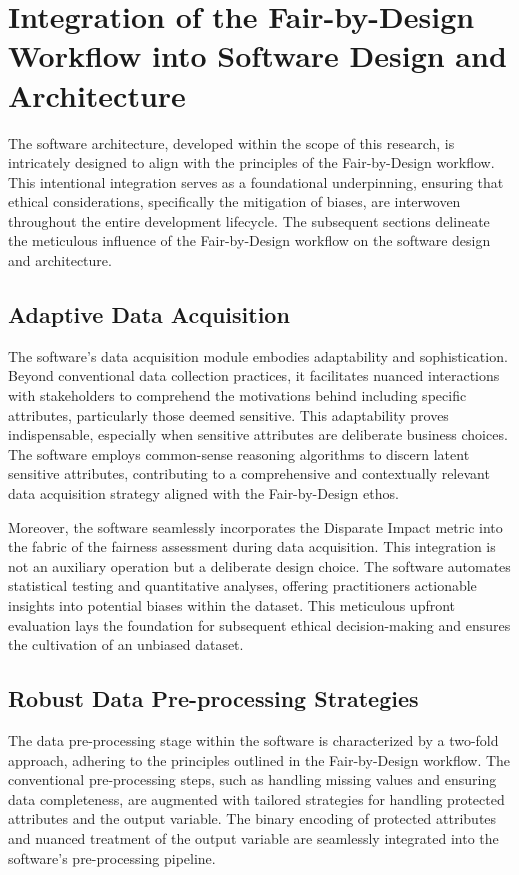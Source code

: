 \section{Integration of the Fair-by-Design Workflow into Software Design and Architecture}

The software architecture, developed within the scope of this research, is intricately designed to align with the principles of the Fair-by-Design workflow. This intentional integration serves as a foundational underpinning, ensuring that ethical considerations, specifically the mitigation of biases, are interwoven throughout the entire development lifecycle. The subsequent sections delineate the meticulous influence of the Fair-by-Design workflow on the software design and architecture.

\subsection{Adaptive Data Acquisition}

The software's data acquisition module embodies adaptability and sophistication. Beyond conventional data collection practices, it facilitates nuanced interactions with stakeholders to comprehend the motivations behind including specific attributes, particularly those deemed sensitive. This adaptability proves indispensable, especially when sensitive attributes are deliberate business choices. The software employs common-sense reasoning algorithms to discern latent sensitive attributes, contributing to a comprehensive and contextually relevant data acquisition strategy aligned with the Fair-by-Design ethos.

Moreover, the software seamlessly incorporates the Disparate Impact metric into the fabric of the fairness assessment during data acquisition. This integration is not an auxiliary operation but a deliberate design choice. The software automates statistical testing and quantitative analyses, offering practitioners actionable insights into potential biases within the dataset. This meticulous upfront evaluation lays the foundation for subsequent ethical decision-making and ensures the cultivation of an unbiased dataset.

\subsection{Robust Data Pre-processing Strategies}

The data pre-processing stage within the software is characterized by a two-fold approach, adhering to the principles outlined in the Fair-by-Design workflow. The conventional pre-processing steps, such as handling missing values and ensuring data completeness, are augmented with tailored strategies for handling protected attributes and the output variable. The binary encoding of protected attributes and nuanced treatment of the output variable are seamlessly integrated into the software's pre-processing pipeline.

